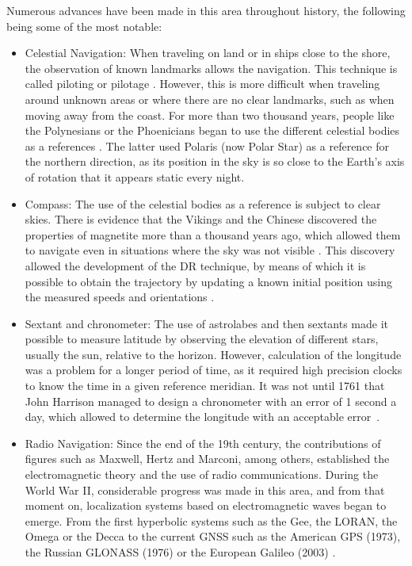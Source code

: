 Numerous advances have been made in this area throughout history, the following being some of the most notable:
\begin{itemize}	
	\item Celestial Navigation: When traveling on land or in ships close to the shore, the observation of known landmarks allows the navigation. This technique is called piloting or pilotage \cite{bowditch_originally_by_american_2017}. However, this is more difficult when traveling around unknown areas or where there are no clear landmarks, such as when moving away from the coast. For more than two thousand years, people like the Polynesians or the Phoenicians began to use the different celestial bodies as a references \cite{titterton_strapdown_2004}. The latter used Polaris (now Polar Star) as a reference for the northern direction, as its position in the sky is so close to the Earth's axis of rotation that it appears static every night.
	\item Compass: The use of the celestial bodies as a reference is subject to clear skies. There is evidence that the Vikings and the Chinese discovered the properties of magnetite more than a thousand years ago, which allowed them to navigate even in situations where the sky was not visible \cite{titterton_strapdown_2004}. This discovery allowed the development of the DR technique, by means of which it is possible to obtain the trajectory by updating a known initial position using the measured speeds and orientations \cite{bowditch_originally_by_american_2017}.
	\item Sextant and chronometer: The use of astrolabes and then sextants made it possible to measure latitude by observing the elevation of different stars, usually the sun, relative to the horizon. However, calculation of the longitude was a problem for a longer period of time, as it required high precision clocks to know the time in a given reference meridian. It was not until 1761 that John Harrison managed to design a chronometer with an error of 1 second a day, which allowed to determine the longitude with an acceptable error~\cite{titterton_strapdown_2004}.
	\item Radio Navigation: Since the end of the 19th century, the contributions of figures such as Maxwell, Hertz and Marconi, among others, established the electromagnetic theory and the use of radio communications. During the World War II, considerable progress was made in this area, and from that moment on, localization systems based on electromagnetic waves began to emerge. From the first hyperbolic systems such as the Gee, the LORAN, the Omega or the Decca to the current GNSS such as the American GPS (1973), the Russian GLONASS (1976) or the European Galileo (2003) \cite{groves_principles_2008}.

\end{itemize}
